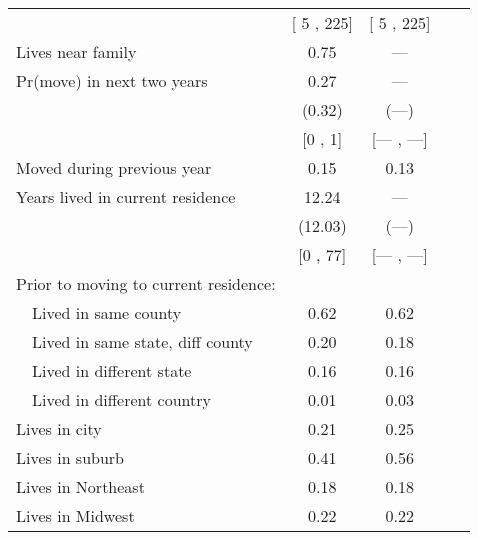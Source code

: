 \begin{table}[ht]
\begin{footnotesize}
\begin{threeparttable}
\begin{tabular}{lcccc}
                                          &[ 5 , 225]&[ 5 , 225]\\ 
Lives near family                         & 0.75                        & ---                                                   \\ 
Pr(move) in next two years                & 0.27                        & ---                                                   \\ 
                                          &(0.32)                       & (---)                                                 \\ 
                                          &[0 , 1]& [--- , ---]                                         \\ 
Moved during previous year                & 0.15                        & 0.13                            \\ 
Years lived in current residence          & 12.24                        & ---                                                   \\ 
                                          &(12.03)                      & (---)                                                 \\ 
                                          &[0 , 77]& [--- , ---]                                         \\ 
Prior to moving to current residence: \\ 
~~Lived in same county                    & 0.62                        & 0.62                            \\ 
~~Lived in same state, diff county        & 0.20                        & 0.18                            \\ 
~~Lived in different state                & 0.16                        & 0.16                            \\ 
~~Lived in different country              & 0.01                        & 0.03                            \\ 
Lives in city                             & 0.21                        & 0.25                            \\ 
Lives in suburb                           & 0.41                        & 0.56                            \\ 
Lives in Northeast                        & 0.18                        & 0.18                            \\ 
Lives in Midwest                          & 0.22                        & 0.22                            \\ 

\end{tabular}
\end{threeparttable}
\end{footnotesize}
\end{table}

